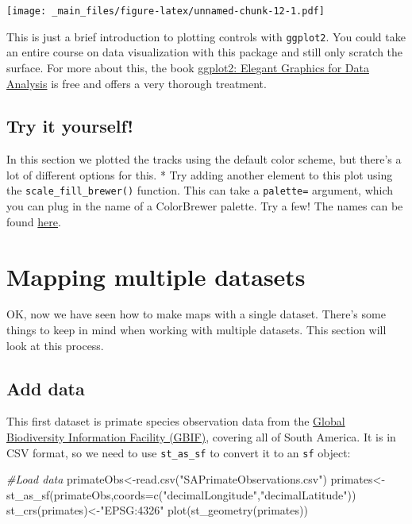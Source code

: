 \documentclass[
]{book}
\newenvironment{Shaded}{\begin{snugshade}}{\end{snugshade}}
\newcommand{\AttributeTok}[1]{\textcolor[rgb]{0.77,0.63,0.00}{#1}}
\newcommand{\CommentTok}[1]{\textcolor[rgb]{0.56,0.35,0.01}{\textit{#1}}}
\newcommand{\FunctionTok}[1]{\textcolor[rgb]{0.00,0.00,0.00}{#1}}
\newcommand{\NormalTok}[1]{#1}
\newcommand{\OtherTok}[1]{\textcolor[rgb]{0.56,0.35,0.01}{#1}}
\newcommand{\StringTok}[1]{\textcolor[rgb]{0.31,0.60,0.02}{#1}}
\begin{document}
\texttt{[image: \_main\_files/figure-latex/unnamed-chunk-12-1.pdf]}

This is just a brief introduction to plotting controls with \texttt{ggplot2}. You could take an entire course on data visualization with this package and still only scratch the surface. For more about this, the book \href{https://ggplot2-book.org/}{ggplot2: Elegant Graphics for Data Analysis} is free and offers a very thorough treatment.

\hypertarget{try-it-yourself}{%
\section{Try it yourself!}\label{try-it-yourself}}

In this section we plotted the tracks using the default color scheme, but there's a lot of different options for this.
* Try adding another element to this plot using the \texttt{scale\_fill\_brewer()} function. This can take a \texttt{palette=} argument, which you can plug in the name of a ColorBrewer palette. Try a few! The names can be found \href{http://applied-r.com/rcolorbrewer-palettes/}{here}.

\hypertarget{mapping-multiple-datasets}{%
\chapter{Mapping multiple datasets}\label{mapping-multiple-datasets}}

OK, now we have seen how to make maps with a single dataset. There's some things to keep in mind when working with multiple datasets. This section will look at this process.

\hypertarget{add-data}{%
\section{Add data}\label{add-data}}

This first dataset is primate species observation data from the \href{https://www.gbif.org/}{Global Biodiversity Information Facility (GBIF)}, covering all of South America. It is in CSV format, so we need to use \texttt{st\_as\_sf} to convert it to an \texttt{sf} object:

\begin{Shaded}
\begin{Highlighting}[]
\CommentTok{\#Load data}
\NormalTok{primateObs}\OtherTok{\textless{}{-}}\FunctionTok{read.csv}\NormalTok{(}\StringTok{"SAPrimateObservations.csv"}\NormalTok{)}
\NormalTok{primates}\OtherTok{\textless{}{-}}\FunctionTok{st\_as\_sf}\NormalTok{(primateObs,}\AttributeTok{coords=}\FunctionTok{c}\NormalTok{(}\StringTok{"decimalLongitude"}\NormalTok{,}\StringTok{"decimalLatitude"}\NormalTok{))}
\FunctionTok{st\_crs}\NormalTok{(primates)}\OtherTok{\textless{}{-}}\StringTok{"EPSG:4326"}
\FunctionTok{plot}\NormalTok{(}\FunctionTok{st\_geometry}\NormalTok{(primates))}
\end{Highlighting}
\end{Shaded}
\end{document}
